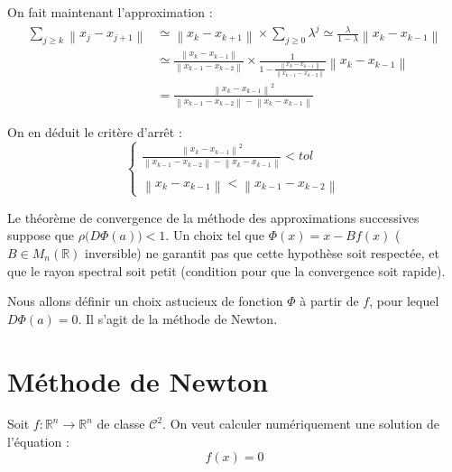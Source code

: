 \documentclass[a4paper,11pt]{article}
\newcommand{\R}{\mathbb{R}}
\newcommand{\norm}[1]{\left\lVert#1\right\rVert}
\theoremstyle{plain} %
\begin{document}
\begin{enumerate}[a)]
        On fait maintenant l'approximation :
        \begin{align*}
            \sum_{j \geq k} \norm{x_j - x_{j+1}} & \simeq \norm{x_k - x_{k+1}} \times \sum_{j \geq 0} \lambda ^j \simeq \frac{\lambda}{1 - \lambda} \norm{x_k - x_{k-1}} \\
            & \simeq \frac{\norm{x_k - x_{k-1}}}{\norm{x_{k-1} - x_{k-2}}} \times \frac{1}{1-\frac{\norm{x_k - x_{k-1}}}{\norm{x_{k-1}-x_{k-2}}}} \norm{x_k - x_{k-1}} \\
            & = \frac{\norm{x_k - x_{k-1}}^2}{\norm{x_{k-1} - x_{k-2}} - \norm{x_k - x_{k-1}}}
        \end{align*}

        On en déduit le critère d'arrêt :
        \begin{equation*}
            \left\lbrace
            \begin{array}{c}
                \displaystyle\frac{\norm{x_k - x_{k-1}}^2}{\norm{x_{k-1} - x_{k-2}} - \norm{x_k - x_{k-1}}} < tol \\
                \\
                \norm{x_k - x_{k-1}} < \norm{x_{k-1} - x_{k-2}}
            \end{array}
            \right.
            \tag{c}
        \end{equation*}
\end{enumerate}


        Le théorème de convergence de la méthode des approximations successives suppose que $\rho \big( D\Phi(a) \big) < 1$. 
        Un choix tel que $\Phi(x) = x - B f(x)$ ($B \in M_n(\R)$ inversible) ne garantit pas
        que cette hypothèse soit respectée, et que le rayon spectral soit petit 
        (condition pour que la convergence soit rapide).

        Nous allons définir un choix astucieux de fonction $\Phi$ à partir de $f$, pour
        lequel $D\Phi(a) = 0$. Il s'agit de la méthode de Newton.

\section{Méthode de Newton}

    Soit $f : \R^n \longrightarrow \R^n$ de classe $\mathcal{C}^2$. On veut calculer
    numériquement une solution de l'équation :
    \begin{equation}
        f(x) = 0
    \end{equation}
\end{document}
